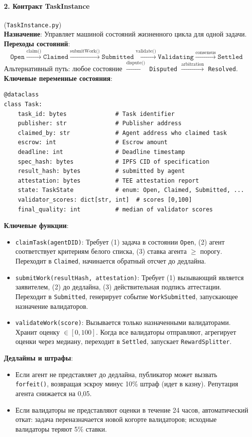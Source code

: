 \documentclass[11pt]{article}
\begin{document}
\paragraph{2. Контракт TaskInstance} (\texttt{TaskInstance.py})\\
\textbf{Назначение}: Управляет машиной состояний жизненного цикла для одной задачи.\\
\textbf{Переходы состояний}:
\begin{equation}
\texttt{Open} \xrightarrow{\text{claim()}} \texttt{Claimed} \xrightarrow{\text{submitWork()}} \texttt{Submitted} \xrightarrow{\text{validate()}} \texttt{Validating} \xrightarrow{\text{consensus}} \texttt{Settled}
\end{equation}
Альтернативный путь: любое состояние $\xrightarrow{\text{dispute()}}$ \texttt{Disputed} $\xrightarrow{\text{arbitration}}$ \texttt{Resolved}.\\
\textbf{Ключевые переменные состояния}:
\begin{verbatim}
@dataclass
class Task:
    task_id: bytes              # Task identifier
    publisher: str              # Publisher address
    claimed_by: str             # Agent address who claimed task
    escrow: int                 # Escrow amount
    deadline: int               # Deadline timestamp
    spec_hash: bytes            # IPFS CID of specification
    result_hash: bytes          # submitted by agent
    attestation: bytes          # TEE attestation report
    state: TaskState            # enum: Open, Claimed, Submitted, ...
    validator_scores: dict[str, int]  # scores [0,100]
    final_quality: int          # median of validator scores
\end{verbatim}
\textbf{Ключевые функции}:
\begin{itemize}[noitemsep]
  \item \texttt{claimTask(agentDID)}: Требует (1) задача в состоянии \texttt{Open}, (2) агент соответствует критериям белого списка, (3) ставка агента $\geq$ порогу. Переходит в \texttt{Claimed}, начинается обратный отсчет до дедлайна.
  \item \texttt{submitWork(resultHash, attestation)}: Требует (1) вызывающий является заявителем, (2) до дедлайна, (3) действительная подпись аттестации. Переходит в \texttt{Submitted}, генерирует событие \texttt{WorkSubmitted}, запускающее назначение валидаторов.
  \item \texttt{validateWork(score)}: Вызывается только назначенными валидаторами. Хранит оценку $\in [0,100]$. Когда все валидаторы отправляют, агрегирует оценки через медиану, переходит в \texttt{Settled}, запускает \texttt{RewardSplitter}.
\end{itemize}
\textbf{Дедлайны и штрафы}:
\begin{itemize}[noitemsep]
  \item Если агент не представляет до дедлайна, публикатор может вызвать \texttt{forfeit()}, возвращая эскроу минус 10\% штраф (идет в казну). Репутация агента снижается на 0,05.
  \item Если валидаторы не представляют оценки в течение 24 часов, автоматический откат: задача переназначается новой когорте валидаторов; исходные валидаторы теряют 5\% ставки.
\end{itemize}
\end{document}
